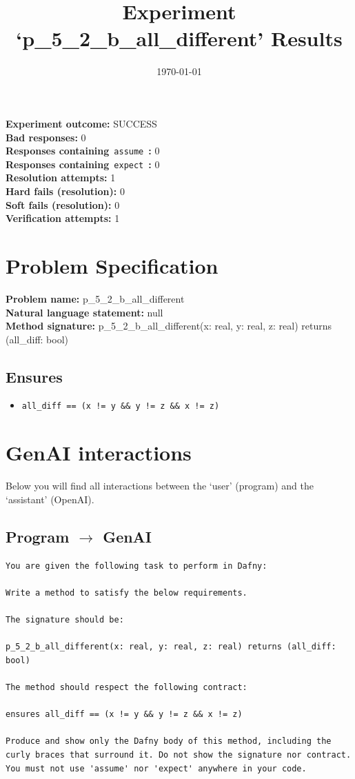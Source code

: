 \documentclass{article}
\begin{document}
\title{Experiment `p\_5\_2\_b\_all\_different' Results}
\author{\today}
\date{}
\maketitle
\textbf{Experiment outcome: }SUCCESS
\\\textbf{Bad responses: }0
\\\textbf{Responses containing}~\texttt{assume}~\textbf{: }0
\\\textbf{Responses containing}~\texttt{expect}~\textbf{: }0
\\\textbf{Resolution attempts: }1
\\\textbf{Hard fails (resolution): }0
\\\textbf{Soft fails (resolution): }0
\\\textbf{Verification attempts: }1
\section*{Problem Specification}
\textbf{Problem name: }p\_5\_2\_b\_all\_different
\\\textbf{Natural language statement: }null
\\\textbf{Method signature: }p\_5\_2\_b\_all\_different(x: real, y: real, z: real) returns (all\_diff: bool)
\subsection*{Ensures}
\begin{itemize}
\item \texttt{all\_diff == (x != y \&\& y != z \&\& x != z)}
\end{itemize}
\clearpage
\section*{GenAI interactions}
Below you will find all interactions between the `user' (program) and the `assistant' (OpenAI).
\subsection*{Program $\rightarrow$ GenAI}
\begin{lstlisting}
You are given the following task to perform in Dafny:

Write a method to satisfy the below requirements.

The signature should be:

p_5_2_b_all_different(x: real, y: real, z: real) returns (all_diff: bool)

The method should respect the following contract:

ensures all_diff == (x != y && y != z && x != z)

Produce and show only the Dafny body of this method, including the curly braces that surround it. Do not show the signature nor contract. You must not use 'assume' nor 'expect' anywhere in your code.
\end{lstlisting}
\end{document}
